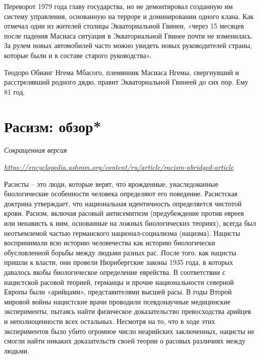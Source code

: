 Переворот 1979 года  главу государства, но не демонтировал созданную им систему управления, основанную на терроре и доминировании одного клана. Как отмечал один из жителей столицы Экваториальной Гвинеи, «через 15 месяцев после падения Масиаса ситуация в Экваториальной Гвинее почти не изменилась. За рулем новых автомобилей часто можно увидеть новых руководителей страны, которые были и в составе старого руководства».

\begin{fancyquotes}
    Теодоро Обианг Нгема Мбасого, племянник Масиаса Нгемы, свергнувший и расстрелявший родного дядю, правит Экваториальной Гвинеей до сих пор. Ему 81 год.
\end{fancyquotes}



\clearpage


\section{Расизм: обзор*}

\textit{Сокращенная версия}

\textit{\url{https://encyclopedia.ushmm.org/content/ru/article/racism-abridged-article}}


Расисты – это люди, которые верят, что врожденные, унаследованные биологические особенности человека определяют его поведение. Расистская доктрина утверждает, что национальная идентичность определяется чистотой крови. Расизм, включая расовый антисемитизм (предубеждение против евреев или ненависть к ним, основанные на ложных биологических теориях), всегда был неотъемлемой частью германского национал-социализма (нацизма). Нацисты воспринимали всю историю человечества как историю биологически обусловленной борьбы между людьми разных рас. После того, как нацисты пришли к власти, они провели Нюрнбергские законы 1935 года, в которых давалось якобы биологическое определение еврейства. В соответствии с нацистской расовой теорией, германцы и прочие национальности северной Европы были «арийцами», представителями высшей расы. В годы Второй мировой войны нацистские врачи проводили псевдонаучные медицинские эксперименты, пытаясь найти физическое доказательство превосходства арийцев и неполноценности всех остальных. Несмотря на то, что в ходе этих экспериментов было убито огромное число неарийских заключенных, нацисты не смогли найти никаких доказательств своей теории о расовых различиях между людьми.

